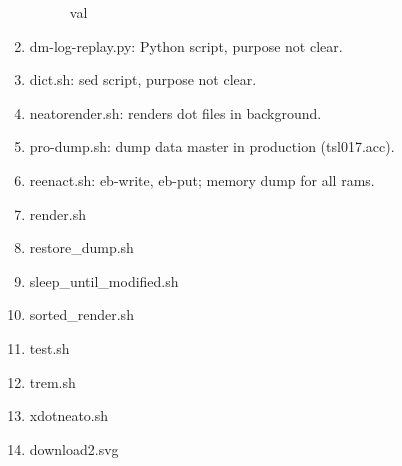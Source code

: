 \documentclass[12pt,a4paper]{report}
\begin{document}
\begin{enumerate}
\begin{figure}
        \caption{val}
        \label{fig:val}
    \end{figure}
\item dm-log-replay.py: Python script, purpose not clear.
\item dict.sh: sed script, purpose not clear.
\item neatorender.sh: renders dot files in background.
\item pro-dump.sh: dump data master in production (tsl017.acc).
\item reenact.sh: eb-write, eb-put; memory dump for all rams.
\item render.sh
\item restore\_dump.sh
\item sleep\_until\_modified.sh
\item sorted\_render.sh
\item test.sh
\item trem.sh
\item xdotneato.sh
\item download2.svg
\end{enumerate}
\end{document}
